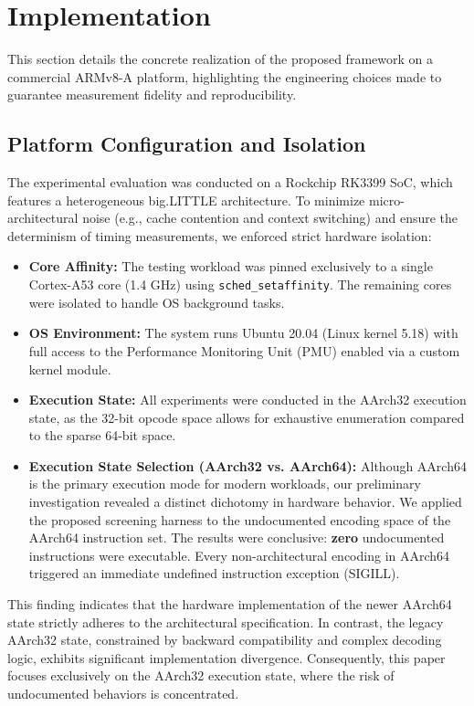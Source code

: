 \documentclass[pdflatex,sn-mathphys]{sn-jnl}%
\theoremstyle{thmstyleone}%
\theoremstyle{thmstyletwo}%
\theoremstyle{thmstylethree}%
\begin{document}
\section{Implementation}\label{sec:impl}

This section details the concrete realization of the proposed framework on a commercial ARMv8-A platform, highlighting the engineering choices made to guarantee measurement fidelity and reproducibility.

\subsection{Platform Configuration and Isolation}
The experimental evaluation was conducted on a Rockchip RK3399 SoC, which features a heterogeneous big.LITTLE architecture. To minimize micro-architectural noise (e.g., cache contention and context switching) and ensure the determinism of timing measurements, we enforced strict hardware isolation:
\begin{itemize}
    \item \textbf{Core Affinity:} The testing workload was pinned exclusively to a single Cortex-A53 core (1.4 GHz) using \texttt{sched\_setaffinity}. The remaining cores were isolated to handle OS background tasks.
    \item \textbf{OS Environment:} The system runs Ubuntu 20.04 (Linux kernel 5.18) with full access to the Performance Monitoring Unit (PMU) enabled via a custom kernel module.
    \item \textbf{Execution State:} All experiments were conducted in the AArch32 execution state, as the 32-bit opcode space allows for exhaustive enumeration compared to the sparse 64-bit space.
    \item \textbf{Execution State Selection (AArch32 vs. AArch64):} 
Although AArch64 is the primary execution mode for modern workloads, our preliminary investigation revealed a distinct dichotomy in hardware behavior. We applied the proposed screening harness to the undocumented encoding space of the AArch64 instruction set. The results were conclusive: \textbf{zero} undocumented instructions were executable. Every non-architectural encoding in AArch64 triggered an immediate undefined instruction exception (SIGILL). 
\end{itemize}

This finding indicates that the hardware implementation of the newer AArch64 state strictly adheres to the architectural specification. In contrast, the legacy AArch32 state, constrained by backward compatibility and complex decoding logic, exhibits significant implementation divergence. Consequently, this paper focuses exclusively on the AArch32 execution state, where the risk of undocumented behaviors is concentrated.
\end{document}
